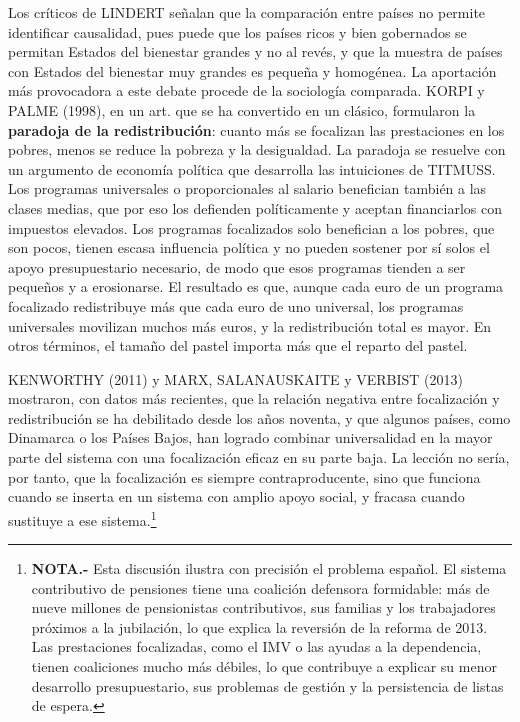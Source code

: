 \documentclass[10pt,a4paper]{article}
\begin{document}
Los críticos de LINDERT señalan que la comparación entre países no permite identificar causalidad, pues puede que los países ricos y bien gobernados se permitan Estados del bienestar grandes y no al revés, y que la muestra de países con Estados del bienestar muy grandes es pequeña y homogénea. La aportación más provocadora a este debate procede de la sociología comparada. KORPI y PALME (1998), en un art. que se ha convertido en un clásico, formularon la \textbf{paradoja de la redistribución}: cuanto más se focalizan las prestaciones en los pobres, menos se reduce la pobreza y la desigualdad. La paradoja se resuelve con un argumento de economía política que desarrolla las intuiciones de TITMUSS. Los programas universales o proporcionales al salario benefician también a las clases medias, que por eso los defienden políticamente y aceptan financiarlos con impuestos elevados. Los programas focalizados solo benefician a los pobres, que son pocos, tienen escasa influencia política y no pueden sostener por sí solos el apoyo presupuestario necesario, de modo que esos programas tienden a ser pequeños y a erosionarse. El resultado es que, aunque cada euro de un programa focalizado redistribuye más que cada euro de uno universal, los programas universales movilizan muchos más euros, y la redistribución total es mayor. En otros términos, el tamaño del pastel importa más que el reparto del pastel.

KENWORTHY (2011) y MARX, SALANAUSKAITE y VERBIST (2013) mostraron, con datos más recientes, que la relación negativa entre focalización y redistribución se ha debilitado desde los años noventa, y que algunos países, como Dinamarca o los Países Bajos, han logrado combinar universalidad en la mayor parte del sistema con una focalización eficaz en su parte baja. La lección no sería, por tanto, que la focalización es siempre contraproducente, sino que funciona cuando se inserta en un sistema con amplio apoyo social, y fracasa cuando sustituye a ese sistema.\footnote{%
    \textbf{NOTA.-} Esta discusión ilustra con precisión el problema español. El sistema contributivo de pensiones tiene una coalición defensora formidable: más de nueve millones de pensionistas contributivos, sus familias y los trabajadores próximos a la jubilación, lo que explica la reversión de la reforma de 2013. Las prestaciones focalizadas, como el IMV o las ayudas a la dependencia, tienen coaliciones mucho más débiles, lo que contribuye a explicar su menor desarrollo presupuestario, sus problemas de gestión y la persistencia de listas de espera.
}
\end{document}
